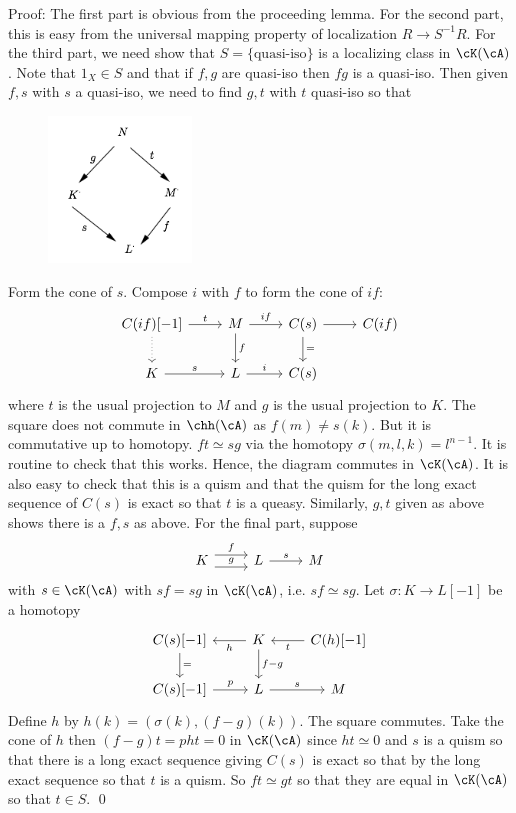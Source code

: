 \noindent Proof: The first part is obvious from the proceeding lemma. For the second part, this is easy from the universal mapping property of localization $R \to S^{-1}R$. For the third part, we need show that $S=\{\text{quasi-iso}\}$ is a localizing class in $\cK(\cA)$. Note that $1_X \in S$ and that if $f,g$ are quasi-iso then $fg$ is a quasi-iso. Then given $f,s$ with $s$ a quasi-iso, we need to find $g,t$ with $t$ quasi-iso so that 

\begin{figure}[H] 
   \centering
   \includegraphics[width=1.5in]{images/p11.png} 
\end{figure}

Form the cone of $s$. Compose $i$ with $f$ to form the cone of $if$:
\[
\begin{tikzcd}
C(if)[-1] \arrow[dotted]{d} \arrow{r}{t} & M \arrow{d}{f} \arrow{r}{if} & C(s) \arrow{d}{=} \arrow{r} & C(if) \\
K \arrow{r}{s} & L \arrow{r}{i} & C(s) & 
\end{tikzcd}
\]
where $t$ is the usual projection to $M$ and $g$ is the usual projection to $K$. The square does not commute in $\chh(\cA)$ as $f(m) \neq s(k)$. But it is commutative up to homotopy. $ft \simeq sg$ via the homotopy $\sigma(m,l,k)=l^{n-1}$. It is routine to check that this works. Hence, the diagram commutes in $\cK(\cA)$. It is also easy to check that this is a quism and that the quism for the long exact sequence of $C(s)$ is exact so that $t$ is a queasy. Similarly, $g,t$ given as above shows there is a $f,s$ as above. For the final part, suppose 
\[
\begin{tikzcd}
K \arrow[yshift=1ex]{r}{f} \arrow[yshift= -1ex]{r}{g} & L \arrow{r}{s} & M
\end{tikzcd}
\]
with $s \in \cK(\cA)$ with $sf=sg$ in $\cK(\cA)$, i.e. $sf \simeq sg$. Let $\sigma: K \to L[-1]$ be a homotopy 
\[
\begin{tikzcd}
C(s)[-1] \arrow{d}{=} & K \arrow{d}{f-g} \arrow{l}{h} & C(h)[-1] \arrow{l}{t} \\
C(s)[-1] \arrow{r}{p} & L \arrow{r}{s} & M
\end{tikzcd}
\]
Define $h$ by $h(k)=(\sigma(k),(f-g)(k))$. The square commutes. Take the cone of $h$ then $(f-g)t=pht=0$ in $\cK(\cA)$ since $ht \simeq 0$ and $s$ is a quism so that there is a long exact sequence giving $C(s)$ is exact so that by the long exact sequence so that $t$ is a quism. So $ft \simeq gt$ so that they are equal in $\cK(\cA)$ so that $t \in S$. \qed \\

